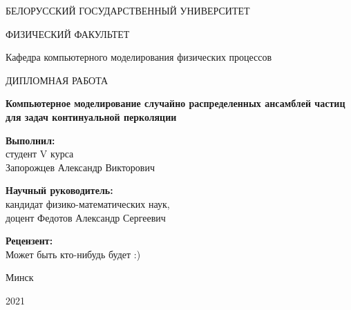 \begin{titlepage}
\begin{center}
БЕЛОРУССКИЙ ГОСУДАРСТВЕННЫЙ УНИВЕРСИТЕТ

ФИЗИЧЕСКИЙ ФАКУЛЬТЕТ

Кафедра компьютерного моделирования физических процессов
\end{center}

\vspace{5cm}

\begin{center}
\LARGE {ДИПЛОМНАЯ РАБОТА}
\end{center}

\begin{center}
\LARGE \bf{Компьютерное моделирование случайно распределенных ансамблей частиц для задач континуальной перколяции}
\end{center}

\vspace{2cm}

\large
\begin{flushright}
\textbf{Выполнил:}\\
студент V курса\\
Запорожцев Александр Викторович\\

\vspace{0.5cm}

\textbf{Научный руководитель:}\\
кандидат физико-математических наук, \\
доцент Федотов Александр Сергеевич
\end{flushright}
\vspace{0.5cm}

\begin{flushright}
\textbf{Рецензент:}\\
Может быть кто-нибудь будет :)  
\end{flushright}

\vspace{1cm}

\begin{center}
Минск 

2021
\end{center}

\end{titlepage}
